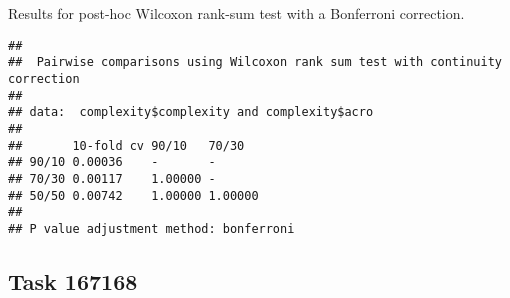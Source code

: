 \documentclass[
]{book}
\newenvironment{Shaded}{\begin{snugshade}}{\end{snugshade}}
\newcommand{\AttributeTok}[1]{\textcolor[rgb]{0.13,0.29,0.53}{#1}}
\newcommand{\ConstantTok}[1]{\textcolor[rgb]{0.56,0.35,0.01}{#1}}
\newcommand{\FunctionTok}[1]{\textcolor[rgb]{0.13,0.29,0.53}{\textbf{#1}}}
\newcommand{\NormalTok}[1]{#1}
\newcommand{\SpecialCharTok}[1]{\textcolor[rgb]{0.81,0.36,0.00}{\textbf{#1}}}
\newcommand{\StringTok}[1]{\textcolor[rgb]{0.31,0.60,0.02}{#1}}
\begin{document}
Results for post-hoc Wilcoxon rank-sum test with a Bonferroni correction.

\begin{Shaded}
\end{Shaded}

\begin{verbatim}
## 
##  Pairwise comparisons using Wilcoxon rank sum test with continuity correction 
## 
## data:  complexity$complexity and complexity$acro 
## 
##       10-fold cv 90/10   70/30  
## 90/10 0.00036    -       -      
## 70/30 0.00117    1.00000 -      
## 50/50 0.00742    1.00000 1.00000
## 
## P value adjustment method: bonferroni
\end{verbatim}

\hypertarget{task-167168-1}{%
\subsection{Task 167168}\label{task-167168-1}}
\end{document}
